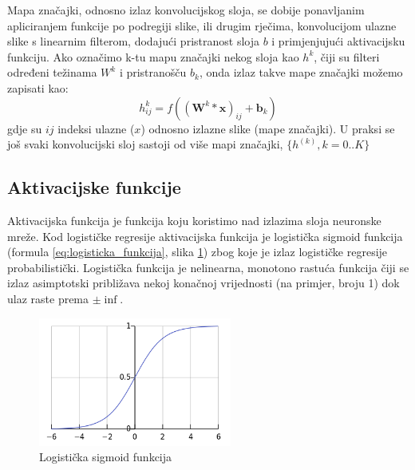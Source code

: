 \documentclass[times, utf8, diplomski, numeric]{fer}
\begin{document}
Mapa značajki, odnosno izlaz konvolucijskog sloja, se dobije ponavljanim apliciranjem funkcije po podregiji slike, ili drugim rječima, konvolucijom ulazne slike s linearnim filterom, dodajući pristranost sloja $b$ i primjenjujući aktivacijsku funkciju. Ako označimo k-tu mapu značajki nekog sloja kao $h^k$, čiji su filteri određeni težinama $W^k$ i pristranošču $b_k$, onda izlaz takve mape značajki možemo zapisati kao:
\begin{equation}
  h_{ij}^k = f \left( \left( \boldsymbol{W}^k * \boldsymbol{x} \right)_{ij} + \boldsymbol{b}_k \right)
\end{equation}
gdje su $ij$ indeksi ulazne ($x$) odnosno izlazne slike (mape značajki).
U praksi se još svaki konvolucijski sloj sastoji od više mapi značajki, $\{ h^{(k)}, k = 0..K \}$


\subsection{Aktivacijske funkcije}
\label{chap:aktivacijske_funkcije}

Aktivacijska funkcija je funkcija koju koristimo nad izlazima sloja neuronske mreže. %
Kod logističke regresije aktivacijska funkcija je logistička sigmoid funkcija (formula \ref{eq:logisticka_funkcija}, slika \ref{fig:logistic_sigmoid}) zbog koje je izlaz logističke regresije probabilistički. Logistička funkcija je nelinearna, monotono rastuća funkcija čiji se izlaz asimptotski približava nekoj konačnoj vrijednosti (na primjer, broju 1) dok ulaz raste prema $\pm \inf$.

\begin{figure}[htb]
\centering
\includegraphics[width=240px]{imgs/logistic_curve.png}
\caption{Logistička sigmoid funkcija}
\label{fig:logistic_sigmoid}
\end{figure}
\end{document}

